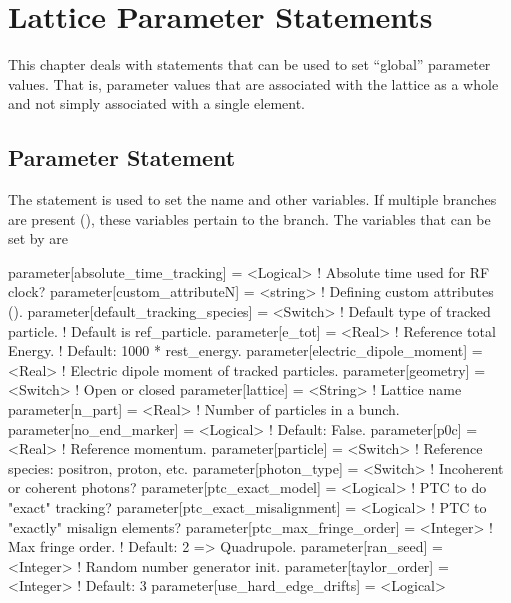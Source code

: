 \chapter{Lattice Parameter Statements}

This chapter deals with statements that can be used to set ``global''
parameter values. That is, parameter values that are associated with
the lattice as a whole and not simply associated with a single element.

\section{Parameter Statement}
\label{s:param}


The  statement is used to set the  name and
other variables. If multiple branches are present (), these
variables pertain to the  branch. The variables that can be
set by  are
\begin{example}
  parameter[absolute_time_tracking]   = <Logical>  ! Absolute time used for RF clock?
  parameter[custom_attributeN]        = <string>   ! Defining custom attributes ().
  parameter[default_tracking_species] = <Switch>   ! Default type of tracked particle. 
                                                   !    Default is ref_particle.
  parameter[e_tot]                    = <Real>     ! Reference total Energy. 
                                                   !      Default: 1000 * rest_energy.
  parameter[electric_dipole_moment]   = <Real>     ! Electric dipole moment of tracked particles.
  parameter[geometry]                 = <Switch>   ! Open or closed
  parameter[lattice]                  = <String>   ! Lattice name 
  parameter[n_part]                   = <Real>     ! Number of particles in a bunch.
  parameter[no_end_marker]            = <Logical>  ! Default: False.
  parameter[p0c]                      = <Real>     ! Reference momentum.
  parameter[particle]                 = <Switch>   ! Reference species: positron, proton, etc.
  parameter[photon_type]              = <Switch>   ! Incoherent or coherent photons?
  parameter[ptc_exact_model]          = <Logical>  ! PTC to do "exact" tracking?
  parameter[ptc_exact_misalignment]   = <Logical>  ! PTC to "exactly" misalign elements?
  parameter[ptc_max_fringe_order]     = <Integer>  ! Max fringe order. 
                                                   !    Default: 2 => Quadrupole.
  parameter[ran_seed]                 = <Integer>  ! Random number generator init.
  parameter[taylor_order]             = <Integer>  ! Default: 3
  parameter[use_hard_edge_drifts]     = <Logical>
\end{example}

